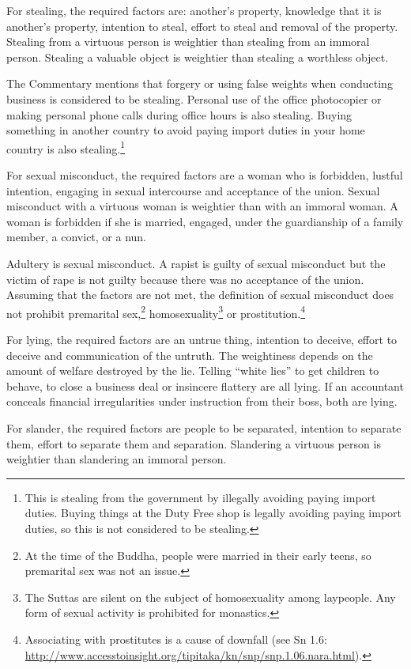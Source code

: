 For stealing, the required factors are: another’s property, knowledge that it is another’s property, intention to steal, effort to steal and removal of the property. Stealing from a virtuous person is weightier than stealing from an immoral person. Stealing a valuable object is weightier than stealing a worthless object.

The Commentary mentions that forgery or using false weights when conducting business is considered to be stealing. Personal use of the office photocopier or making personal phone calls during office hours is also stealing. Buying something in another country to avoid paying import duties in your home country is also stealing.\footnote{This is stealing from the government by illegally avoiding paying import duties. Buying things at the Duty Free shop is legally avoiding paying import duties, so this is not considered to be stealing.}

For sexual misconduct, the required factors are a woman who is forbidden, lustful intention, engaging in sexual intercourse and acceptance of the union. Sexual misconduct with a virtuous woman is weightier than with an immoral woman. A woman is forbidden if she is married, engaged, under the guardianship of a family member, a convict, or a nun.

Adultery is sexual misconduct. A rapist is guilty of sexual misconduct but the victim of rape is not guilty because there was no acceptance of the union. Assuming that the factors are not met, the definition of sexual misconduct does not prohibit premarital sex,\footnote{At the time of the Buddha, people were married in their early teens, so premarital sex was not an issue.} homosexuality\footnote{The Suttas are silent on the subject of homosexuality among laypeople. Any form of sexual activity is prohibited for monastics.} or prostitution.\footnote{Associating with prostitutes is a cause of downfall (see Sn 1.6: \url{http://www.accesstoinsight.org/tipitaka/kn/snp/snp.1.06.nara.html}).}

For lying, the required factors are an untrue thing, intention to deceive, effort to deceive and communication of the untruth. The weightiness depends on the amount of welfare destroyed by the lie. Telling “white lies” to get children to behave, to close a business deal or insincere flattery are all lying. If an accountant conceals financial irregularities under instruction from their boss, both are lying.

\pagebreak

For slander, the required factors are people to be separated, intention to separate them, effort to separate them and separation. Slandering a virtuous person is weightier than slandering an immoral person.

